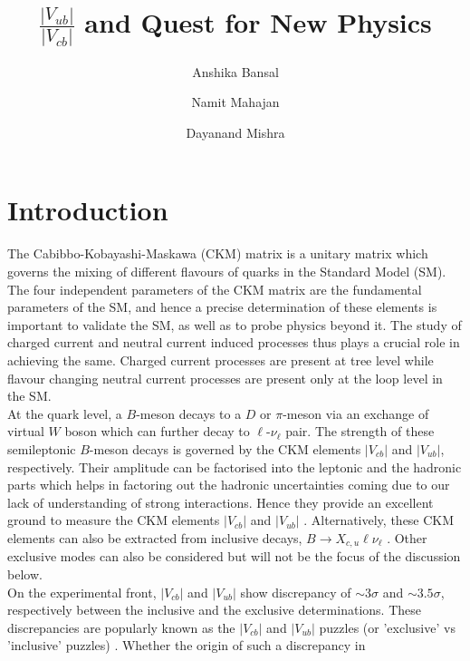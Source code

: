 \documentclass[a4paper,11pt]{article}
\title{\boldmath $\frac{|V_{ub}|}{|V_{cb}|}$ and Quest for New Physics\\
}
\author[a,b]{Anshika Bansal}
\author[a]{Namit Mahajan}
\author[a,b]{Dayanand Mishra}
\affiliation[a]{Physical Research Laboratory,\\Ahmedabad, India.}
\affiliation[b]{Indian Institute of Technology, \\Gandhinagar, India.}
\begin{document}
 
\maketitle
\flushbottom

\section{Introduction}
	\label{sec1}
	The Cabibbo-Kobayashi-Maskawa (CKM) matrix is a unitary matrix which governs the mixing of different flavours of quarks in the 
	Standard Model (SM). The four independent parameters of the CKM matrix are the fundamental parameters of the SM, and hence a 
	precise determination of these elements is important to validate the SM, as well as to probe physics beyond it. The study of 
	charged current and neutral current induced processes thus plays a crucial role in achieving the same. Charged current processes 
	are present at tree level while flavour changing neutral current processes are present only at the loop level in the SM. \\
	 At the quark level, a $B$-meson decays to a $D$ or $\pi$-meson via an exchange of virtual $W$ boson which can further decay 
	 to $\ell$-$\nu_\ell$ pair. The strength of these semileptonic $B$-meson decays  is governed by the CKM elements 
	 $\left|V_{cb}\right|$ and $\left|V_{ub}\right|$, respectively. Their amplitude can be factorised into the leptonic and the hadronic parts which helps in factoring out the hadronic
	 uncertainties coming due to our lack of understanding of strong interactions. Hence they provide an excellent ground to 
	 measure the CKM elements $|V_{cb}|$ and $|V_{ub}|$ 
	 \cite{Bourrely:2008za,Bailey:2008wp,Monahan:2018lzv,Jaiswal:2017rve,Grinstein:2017nlq,Na:2015kha,Biswas:2021qyq,Bernlochner:2017jka,Wang:2017jow}. Alternatively, these CKM elements can also be extracted from inclusive decays,
	 $B\to X_{c,u} \ell \nu_{\ell}$ \cite{Lange:2005yw,Gambino:2007rp,Leibovich:1999xf,Bauer:2002sh,Gambino:2013rza,
	 Alberti:2014yda,Khodjamirian:2011ub,Boyd:1995cf,Ricciardi:2019zph,Alberti:2016fba}. Other exclusive modes can also be considered but will not be the focus 
	 of the discussion below.\\ 
	 On the experimental front, $|V_{cb}|$ and $|V_{ub}|$ show discrepancy of $\sim 3\sigma$ and $\sim 3.5\sigma$, 
	 respectively between the inclusive and the exclusive determinations. These discrepancies are popularly known as the 
	 $|V_{cb}|$ and $|V_{ub}|$ puzzles (or 'exclusive' vs 'inclusive' puzzles) 
	 \cite{HFLAV:2019otj,Zyla:2020zbs,Aoki:2021kgd,Gambino:2020jvv}. Whether the origin of such a discrepancy in 
\end{document}
